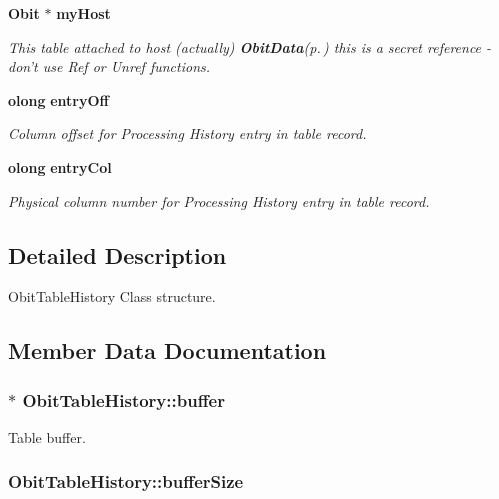 \begin{CompactItemize}
{\bf Obit} $\ast$ {\bf my\-Host}
\begin{CompactList}\small\item\em This table attached to host (actually) {\bf Obit\-Data}{\rm (p.\,\pageref{structObitData})} this is a secret reference - don't use Ref or Unref functions. \item\end{CompactList}\item 
{\bf olong} {\bf entry\-Off}
\begin{CompactList}\small\item\em Column offset for Processing History entry in table record. \item\end{CompactList}\item 
{\bf olong} {\bf entry\-Col}
\begin{CompactList}\small\item\em Physical column number for Processing History entry in table record. \item\end{CompactList}\end{CompactItemize}


\subsection{Detailed Description}
Obit\-Table\-History Class structure. 



\subsection{Member Data Documentation}
\subsubsection{$\ast$ {\bf Obit\-Table\-History::buffer}}\label{structObitTableHistory_o10}


Table buffer. 

\subsubsection{ {\bf Obit\-Table\-History::buffer\-Size}}\label{structObitTableHistory_o11}


